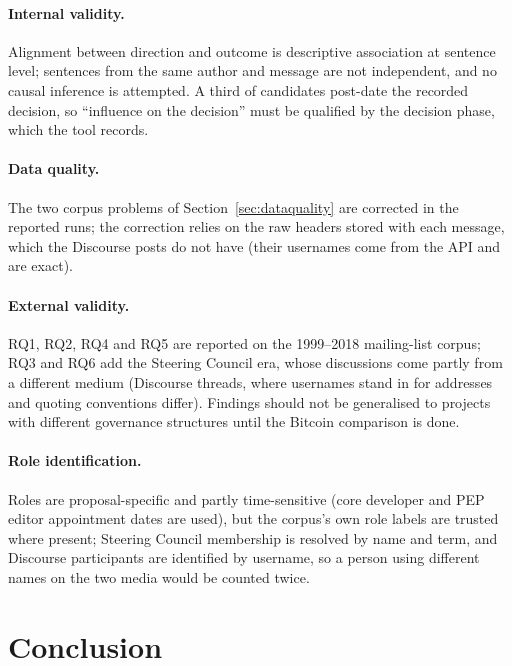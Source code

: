 \documentclass[sigconf,screen]{acmart}
\begin{document}
\paragraph{Internal validity.} Alignment between direction and outcome is descriptive association at sentence level; sentences from the same author and message are not independent, and no causal inference is attempted. A third of candidates post-date the recorded decision, so ``influence on the decision'' must be qualified by the decision phase, which the tool records.

\paragraph{Data quality.} The two corpus problems of Section~\ref{sec:dataquality} are corrected in the reported runs; the correction relies on the raw headers stored with each message, which the Discourse posts do not have (their usernames come from the API and are exact).

\paragraph{External validity.} RQ1, RQ2, RQ4 and RQ5 are reported on the 1999--2018 mailing-list corpus; RQ3 and RQ6 add the Steering Council era, whose discussions come partly from a different medium (Discourse threads, where usernames stand in for addresses and quoting conventions differ). Findings should not be generalised to projects with different governance structures until the Bitcoin comparison is done.

\paragraph{Role identification.} Roles are proposal-specific and partly time-sensitive (core developer and PEP editor appointment dates are used), but the corpus's own role labels are trusted where present; Steering Council membership is resolved by name and term, and Discourse participants are identified by username, so a person using different names on the two media would be counted twice.

\section{Conclusion}
\end{document}
